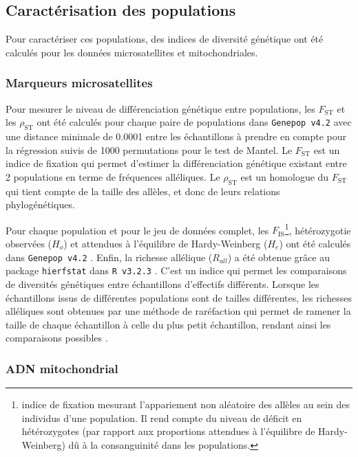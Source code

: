 \documentclass[a4paper,12pt,twoside]{article}\usepackage[]{graphicx}\usepackage[]{color}
\begin{document}
\subsection{Caractérisation des populations}

Pour caractériser ces populations, des indices de diversité génétique ont été calculés pour les données microsatellites et mitochondriales.

\subsubsection*{Marqueurs microsatellites}

Pour mesurer le niveau de différenciation génétique entre populations, les $F_\textrm{ST}$ \citep[méthode de][]{weir1984} et les $\rho_\textrm{ST}$ \citep[méthode de][]{michalakis1996} ont été calculés pour chaque paire de populations dans \texttt{Genepop~v4.2} \citep{rousset2008} avec une distance minimale de 0.0001 entre les échantillons à prendre en compte pour la régression suivis de 1000 permutations pour le test de Mantel. Le $F_\textrm{ST}$ est un indice de fixation qui permet d'estimer la différenciation génétique existant entre 2 populations en terme de fréquences alléliques. Le $\rho_\textrm{ST}$ est un homologue du $F_\textrm{ST}$ qui tient compte de la taille des allèles, et donc de leurs relations phylogénétiques.

Pour chaque population et pour le jeu de données complet, les $F_\textrm{IS}$\footnote{indice de fixation mesurant l'appariement non aléatoire des allèles au sein des individus d'une population. Il rend compte du niveau de déficit en hétérozygotes (par rapport aux proportions attendues à l'équilibre de Hardy-Weinberg) dû à la consanguinité dans les populations.}, hétérozygotie observées ($H_o$) et attendues à l'équilibre de Hardy-Weinberg ($H_e$) ont été calculés dans \texttt{Genepop~v4.2} \citep{rousset2008}. Enfin, la richesse allélique ($R_{all}$) a été obtenue grâce au package \texttt{hierfstat} dans \texttt{R~v3.2.3} \citep{rct2015}. C'est un indice qui permet les comparaisons de diversités génétiques entre échantillons d'effectifs différents. Lorsque les échantillons issus de différentes populations sont de tailles différentes, les richesses alléliques sont obtenues par une méthode de raréfaction qui permet de ramener la taille de chaque échantillon à celle du plus petit échantillon, rendant ainsi les comparaisons possibles \citep{hurlbert1971}.

\subsubsection*{ADN mitochondrial}
\end{document}
